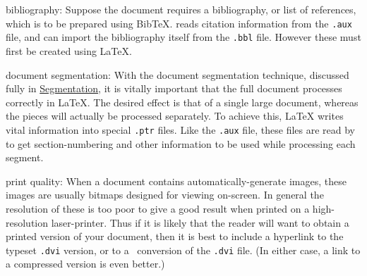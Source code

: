 \begin{htmllist}
\item[bibliography: ]
Suppose the document requires a bibliography, or list of references,
which is to be prepared using Bib\TeX.
\latextohtml{} reads citation information from the \texttt{.aux} file,
and can import the bibliography itself from the \texttt{.bbl} file.
However these must first be created using \LaTeX.



\item[document segmentation: ]
With the document segmentation technique,
discussed fully in \hyperref{a later section}{Section~}{}{Segmentation},
it is vitally important that the full document processes correctly
in \LaTeX. The desired effect is that of a single large document,
whereas the pieces will actually be processed separately.
To achieve this, \LaTeX{} writes vital information into special
\texttt{.ptr} files. Like the \texttt{.aux} file, these files
are read by \latextohtml{} to get section-numbering and other
information to be used while processing each segment.


%
\html{\\}\noindent
\item[print quality: ]
When a document contains automatically-generate images, these images
are usually bitmaps designed for viewing on-screen. In general the
resolution of these is too poor to give a good result when printed
on a high-resolution laser-printer.
Thus if it is likely that the reader will want to obtain
a printed version of your document, then it is best to include
a hyperlink to the typeset \texttt{.dvi} version,
or to a \PS\ conversion of the \texttt{.dvi} file.
(In either case, a link to a compressed version is even better.)

\end{htmllist}



